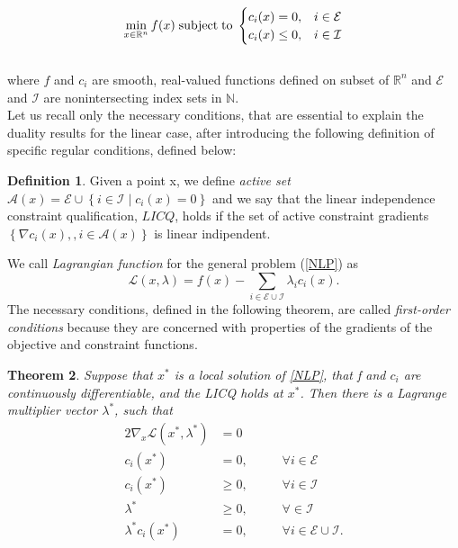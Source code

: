 \documentclass[a4paper,10 pt,titlepage,twoside]{book}
\theoremstyle{plain}
\newtheorem{thm}{Theorem}[chapter]
\theoremstyle{definition}
\newtheorem{defn}[thm]{Definition}
\theoremstyle{remark}
\begin{document}
\begin{equation}\label{NLP}
\min\limits_{x\in\mathbb{R}^{n}} f(x)\text{\;subject\;to\;}\begin{cases} c_{i}(x) = 0, &i \in \mathcal{E}\\ c_{i}(x)\leq 0, &i\in \mathcal{I}\end{cases}
\end{equation}
\\
where $f$ and $c_{i}$ are smooth, real-valued functions defined on subset of $\mathbb{R}^{n}$ and $\mathcal{E}$ and $\mathcal{I}$ are nonintersecting index sets in $\mathbb{N}$.\\Let us recall only the necessary conditions, that are essential to explain the duality results for the linear case, after introducing the following definition of specific regular conditions, defined below:
\begin{defn}
	Given a point x, we define \textit{active set} $\mathcal{A}(x)= \mathcal{E}\cup\left\lbrace i\in\mathcal{I}\;|\;c_{i}(x) =0\right\rbrace$ and we say that the linear independence constraint qualification, $LICQ$, holds if the set of active constraint gradients $\left\lbrace \nabla c_{i}(x),,i\in\mathcal{A}(x)\right\rbrace$ is linear indipendent.
\end{defn}
We call \textit{Lagrangian function} for the general problem (\ref{NLP}) as 
\begin{equation*}
\mathcal{L}\left(x,\lambda\right)=f(x)-\sum_{i\in\mathcal{E}\cup\mathcal{I}}\lambda_{i}c_{i}(x).
\end{equation*}
The necessary conditions, defined in the following theorem, are called \textit{first-order conditions} because they are concerned with properties of the gradients of the objective and constraint functions.

\begin{thm}\label{thm:kkt}
Suppose that $x^{*}$ is a local solution of \ref{NLP}, that f and $c_{i}$ are continuously differentiable, and the LICQ holds at $x^{*}$. Then there is a Lagrange multiplier vector $\lambda^{*}$, such that 
\begin{alignat*}{2}
\nabla_{x}\mathcal{L}(x^{*},\lambda^{*})&=0&&\\
c_{i}(x^{*})&=0, &&\;\;\;\;\forall i\in\mathcal{E}\\
c_{i}(x^{*})&\geq 0, &&\;\;\;\;\forall i\in\mathcal{I}\\
\lambda^{*} &\geq 0, &&\;\;\;\;\forall \in\mathcal{I}\\
\lambda^{*}c_{i}(x^{*})&= 0,&&\;\;\;\;\forall i\in\mathcal{E}\cup\mathcal{I}.\label{CompCon}\\
\end{alignat*} 
\end{thm}
\end{document}
